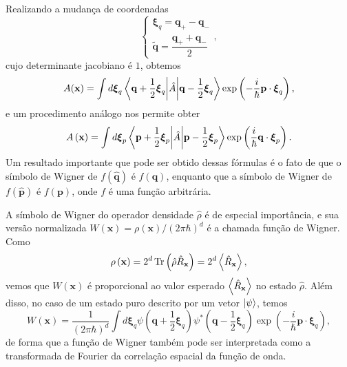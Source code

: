\documentclass[
	12pt,
	oneside,			%
	a4paper,			%
	english,			%
	brazil				%
	]{abntex2}
\theoremstyle{definition}
\begin{document}
Realizando a mudança de coordenadas
\begin{equation}
    \begin{cases}
        \boldsymbol{\xi}_q = \mathbf{q}_+-\mathbf{q}_- \\
        \tilde{\mathbf{q}} = \dfrac{\mathbf{q}_++\mathbf{q}_-}{2}
    \end{cases},
\end{equation}
cujo determinante jacobiano é $1$, obtemos
\begin{equation}
    A(\mathbf{x}) = \int d \boldsymbol{\xi}_q \mel{\mathbf{q}+\frac{1}{2}\boldsymbol{\xi}_q}{\hat{A}}{\mathbf{q}-\frac{1}{2}\boldsymbol{\xi}_q}\exp \left( -\frac{i}{\hbar} \mathbf{p} \cdot \boldsymbol{\xi}_q \right),
\end{equation}
e um procedimento análogo nos permite obter
\begin{equation}
    A\left(\mathbf{x}\right) = \int d \boldsymbol{\xi}_p \mel{\mathbf{p}+\frac{1}{2}\boldsymbol{\xi}_p}{\hat{A}}{\mathbf{p}-\frac{1}{2}\boldsymbol{\xi}_p}\exp \left( \frac{i}{\hbar} \mathbf{q} \cdot \boldsymbol{\xi}_p \right).
\end{equation}
Um resultado importante que pode ser obtido dessas fórmulas é o fato de que o símbolo de Wigner de $f\left(\hat{\mathbf{q}}\right)$ é $f(\mathbf{q})$, enquanto que a símbolo de Wigner de $f\left(\hat{\mathbf{p}}\right)$ é $f(\mathbf{p})$, onde $f$ é uma função arbitrária.

A símbolo de Wigner do operador densidade $\hat{\rho}$ é de especial importância, e sua versão normalizada $W\left(\mathbf{x}\right) = \rho\left(\mathbf{x}\right)/(2\pi \hbar)^d$ é a chamada função de Wigner. Como
\begin{equation}
    \rho\left(\mathbf{x}\right) = 2^d \Tr \left(\hat{\rho} \hat{R}_\mathbf{x}\right) = 2^d \ev{\hat{R}_\mathbf{x}},
\end{equation}
vemos que $W\left(\mathbf{x}\right)$ é proporcional ao valor esperado $\ev{\hat{R}_\mathbf{x}}$ no estado $\hat{\rho}$. Além disso, no caso de um estado puro descrito por um vetor $\ket{\psi}$, temos
\begin{equation}
\label{função de wigner em termos de função de onda}
    W\left(\mathbf{x}\right) = \frac{1}{(2\pi \hbar)^d} \int d \boldsymbol{\xi}_q \psi\left(\mathbf{q}+\frac{1}{2}\boldsymbol{\xi}_q\right) \psi^*\left(\mathbf{q}-\frac{1}{2}\boldsymbol{\xi}_q\right) \exp \left( -\frac{i}{\hbar} \mathbf{p} \cdot \boldsymbol{\xi}_q \right),
\end{equation}
de forma que a função de Wigner também pode ser interpretada como a transformada de Fourier da correlação espacial da função de onda.
\end{document}
